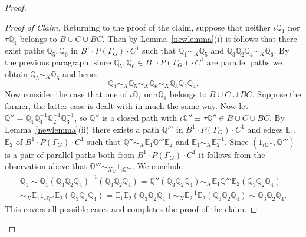 \documentclass[11pt]{amsart}
\theoremstyle{plain}
\begin{document}
\begin{proof}
\begin{proof}[Proof of Claim]
Returning to the proof of the claim, suppose that neither $\iota {\mathbb{Q}}_1$ nor $\tau {\mathbb{Q}}_1$ belongs to $B \cup C \cup BC$. Then by Lemma~\ref{newlemma}(i) it follows that there exist paths ${\mathbb{Q}}_5, {\mathbb{Q}}_6$ in $B^1 \cdot P(\Gamma_G) \cdot C^1$ such that ${\mathbb{Q}}_1 \sim_X {\mathbb{Q}}_5$ and ${\mathbb{Q}}_3 {\mathbb{Q}}_2 {\mathbb{Q}}_4 \sim_X {\mathbb{Q}}_6$. By the previous paragraph, since ${\mathbb{Q}}_5, {\mathbb{Q}}_6 \in B^1 \cdot P(\Gamma_G) \cdot C^1$ are parallel paths we obtain ${\mathbb{Q}}_5 \sim_{X} {\mathbb{Q}}_6$ and hence
\[
{\mathbb{Q}}_1 \sim_X {\mathbb{Q}}_5 \sim_{X} {\mathbb{Q}}_6 \sim_X {\mathbb{Q}}_3 {\mathbb{Q}}_2 {\mathbb{Q}}_4. 
\] 
Now consider the case that one of $\iota {\mathbb{Q}}_1$ or $\tau {\mathbb{Q}}_1$ belongs to $B \cup C \cup BC$. Suppose the former, the latter case is dealt with in much the same way. Now let ${\mathbb{Q}}'' = {\mathbb{Q}}_1 {\mathbb{Q}}_4^{-1} {\mathbb{Q}}_2^{-1} {\mathbb{Q}}_3^{-1}$, so ${\mathbb{Q}}''$ is a closed path with $\iota {\mathbb{Q}}'' \equiv \tau {\mathbb{Q}}'' \in B \cup C \cup BC$. By Lemma~\ref{newlemma}(ii) there exists a path ${\mathbb{Q}}'''$ in $B^1 \cdot P(\Gamma_G) \cdot C^1$ and edges ${\mathbb{E}}_1$, ${\mathbb{E}}_2$ of $\overline{B^1 \cdot P(\Gamma_G) \cdot C^1}$ such that ${\mathbb{Q}}'' \sim_X {\mathbb{E}}_1 {\mathbb{Q}}''' {\mathbb{E}}_2$ and ${\mathbb{E}}_1 \sim_X {\mathbb{E}}_2^{-1}$. Since $(1_{\iota {\mathbb{Q}}'''},{\mathbb{Q}}''')$ is a pair of parallel paths both from $B^1 \cdot P(\Gamma_G) \cdot C^1$ it follows from the observation above that 
${\mathbb{Q}}''' \sim_{X_G} 1_{\iota {\mathbb{Q}}''''}$. We conclude 
\[
\begin{array}{c}
{\mathbb{Q}}_1 \sim {\mathbb{Q}}_1 ({\mathbb{Q}}_3 {\mathbb{Q}}_2 {\mathbb{Q}}_4)^{-1} ({\mathbb{Q}}_3 {\mathbb{Q}}_2 {\mathbb{Q}}_4) =
{\mathbb{Q}}'' ({\mathbb{Q}}_3 {\mathbb{Q}}_2 {\mathbb{Q}}_4) \sim_X 
{\mathbb{E}}_1 {\mathbb{Q}}''' {\mathbb{E}}_2 ({\mathbb{Q}}_3 {\mathbb{Q}}_2 {\mathbb{Q}}_4)  \\
\sim_X {\mathbb{E}}_1 1_{\iota {\mathbb{Q}}'''} {\mathbb{E}}_2 ({\mathbb{Q}}_3 {\mathbb{Q}}_2 {\mathbb{Q}}_4) =
{\mathbb{E}}_1 {\mathbb{E}}_2 ({\mathbb{Q}}_3 {\mathbb{Q}}_2 {\mathbb{Q}}_4) \sim_X
{\mathbb{E}}_2^{-1} {\mathbb{E}}_2 ({\mathbb{Q}}_3 {\mathbb{Q}}_2 {\mathbb{Q}}_4) \sim
{\mathbb{Q}}_3 {\mathbb{Q}}_2 {\mathbb{Q}}_4.
\end{array}
\]
This covers all possible cases and completes the proof of the claim.
\end{proof}


\end{proof}
\end{document}
